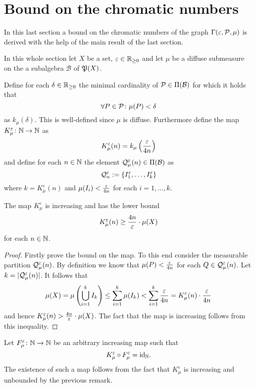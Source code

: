 \section{Bound on the chromatic numbers}\label{sec:bounds}

In this last section a bound on the chromatic numbers of the graph $\Gamma(\varepsilon, \P, \mu)$ is derived with the help of the main result of the last section.

In this whole section let $X$ be a set, $\varepsilon \in \R_{\geq 0}$ and let $\mu$ be a diffuse submeasure on the a subalgebra $\mathcal{B}$ of $\PowS(X)$.

\begin{defin}
  Define for each $\delta \in \R_{\geq 0}$ the minimal cardinality of $\P \in \Pi(\mathcal{B})$ for which it holds that \[\forall P \in \P\colon \mu(P) < \delta\] as $k_\mu(\delta)$. This is well-defined since $\mu$ is diffuse.
  Furthermore define the map $K_\mu^\varepsilon\colon \N \to \N$ as \[K_\mu^\varepsilon(n) = k_\mu\left({\varepsilon \over {4n}}\right)\] and define for each $n \in \N$ the element $\Q_\mu^\varepsilon(n) \in \Pi(\mathcal{B})$ as \[\Q_n^\varepsilon := \{I_1^\varepsilon,\ldots, I^\varepsilon_k\}\] where $k = {K_\mu^\varepsilon(n)}$ and $\mu(I_i) < {\varepsilon \over 4n}$ for each $i=1, \ldots, k$.
\end{defin}

\begin{rem}\label{rem:appr}
  The map $K_\mu^\varepsilon$ is increasing and has the lower bound \[K^\varepsilon_\mu(n) \geq {4n \over \varepsilon} \cdot \mu(X)\] for each $n\in \N$.
\end{rem}


\begin{proof}
  Firstly prove the bound on the map. To this end consider the measurable partition $\Q_\mu^\varepsilon(n)$. By definition we know that $\mu(P) <  {\varepsilon \over 4n}$ for each $Q \in \Q_\mu^\varepsilon(n)$. Let $k = |\Q_\mu^\varepsilon(n)|$.
  It follows that
  \begin{equation*}
    \mu(X) = \mu\left(\bigcup_{i=1}^k I_k\right) \leq \sum\limits_{i=1}^k \mu(I_k) < \sum\limits_{i=1}^k{\varepsilon \over 4n} = K_\mu^\varepsilon(n) \cdot {\varepsilon \over 4n}
  \end{equation*}
  and hence $K_\mu^\varepsilon(n) > {4n \over \varepsilon} \cdot \mu(X)$. The fact that the map is increasing follows from this inequality.
\end{proof}

\begin{assert}
  Let $F_\mu^\varepsilon\colon \N \to \N$ be an arbitrary increasing map such that \[K_\mu^\varepsilon \circ F_\mu^\varepsilon = \id_\N.\] The existence of such a map follows from the fact that $K_\mu^\varepsilon$ is increasing and unbounded by the previous remark.
\end{assert}

